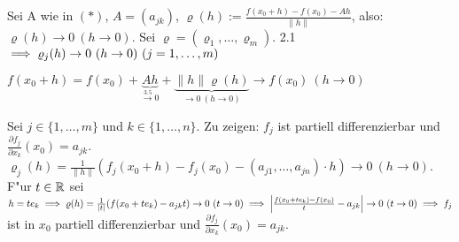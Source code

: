 \documentclass[a4paper,twoside,DIV15,BCOR12mm]{scrbook}
\begin{document}
\begin{beweis}
Sei A wie in $(*)$, $A=(a_{jk})$, $\varrho(h):=\frac{f(x_0+h)-f(x_0)-Ah}{\|h\|}$, also: $\varrho(h)\to0\ (h\to 0)$. Sei $\varrho=(\varrho_1,\ldots,\varrho_m)$. 2.1 $\folgt \varrho_j(h)\to 0\ (h\to 0)\ (j=1,\ldots,m)$
\begin{liste}
\item $f(x_0+h)=f(x_0)+\underbrace{Ah}_{\overset{\text{3.5}}{\to}0}+\underbrace{\|h\|\varrho(h)}_{\to 0\ (h\to 0)}\to f(x_0)\ (h\to 0)$
\item Sei $j\in\{1,\ldots,m\}$ und $k\in\{1,\ldots,n\}$. Zu zeigen: $f_j$ ist partiell differenzierbar und $\frac{\partial f_j}{\partial x_k}(x_0)=a_{jk}$. $\varrho_j(h)=\frac{1}{\|h\|}(f_j(x_0+h)-f_j(x_0)-(a_{j1},\ldots,a_{jn})\cdot h)\to 0\ (h \to 0)$. F"ur $t\in\mathbb{R}$ sei $h=te_k\folgt\varrho(h)=\frac{1}{|t|}(f(x_0+te_k)-a_{jk}t)\to 0\ (t\to 0)\folgt\left|\frac{f(x_0+te_k)-f(x_0)}{t}-a_{jk}\right|\to 0\ (t\to 0)\folgt f_j$ ist in $x_0$ partiell differenzierbar und $\frac{\partial f_j}{\partial x_k}(x_0)=a_{jk}$.
\end{liste}
\end{beweis}
\end{document}
